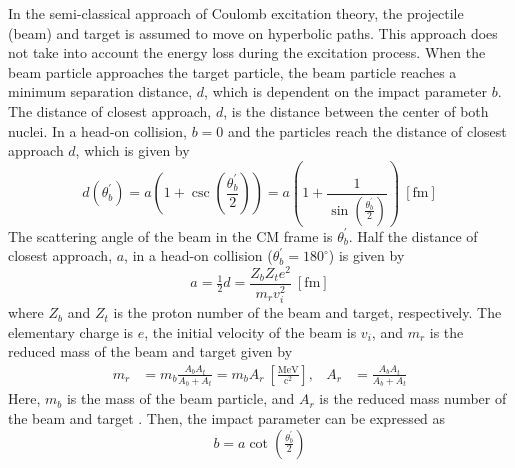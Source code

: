 \documentclass[twoside,english]{uiofysmaster/uiofysmaster}
\begin{document}
In the semi-classical approach of Coulomb excitation theory, the projectile (beam) and target is assumed to move on hyperbolic paths. 
This approach does not take into account the energy loss during the excitation process.
When the beam particle approaches the target particle, the beam particle reaches a minimum separation distance, $d$, which is dependent on the impact parameter $b$. 
The distance of closest approach, $d$, is the distance between the center of both nuclei. 
In a head-on collision, $b = 0$ and the particles reach the distance of closest approach $d$, which is given by
\begin{equation}
	d\left( \theta_b^{'} \right) = a \left( 1 + \csc \left( \frac{\theta_b^{'}}{2} \right) \right) = a \left( 1 + \frac{1}{\sin \left( \frac{\theta_b^{'}}{2} \right)} \right) ~[\text{fm}]
\end{equation}
The scattering angle of the beam in the CM frame is $\theta_b^{'}$.
Half the distance of closest approach, $a$, in a head-on collision ($\theta_b^{'} = 180^\circ$) is given by
\begin{equation}
	 a = \tfrac{1}{2} d = \frac{Z_b Z_t e^2}{m_r v_i^2} ~[\text{fm}]
\end{equation}
where $Z_b$ and $Z_t$ is the proton number of the beam and target, respectively. 
The elementary charge is $e$, the initial velocity of the beam is $v_i$, and $m_r$ is the reduced mass of the beam and target given by
\begin{align}
	 m_r &= m_b \frac{A_b A_t}{A_b + A_t} = m_b A_r  ~\left[ \tfrac{\text{MeV}}{\text{c}^2} \right],
	 &
	 A_r &= \frac{A_b A_t}{A_b + A_t}
\end{align}
Here, $m_b$ is the mass of the beam particle, and $A_r$ is the reduced mass number of the beam and target \cite{RBass, EE-Coulex}. 
Then, the impact parameter can be expressed as
\begin{equation}
	b = a \cot \left( \tfrac{\theta_b^{'}}{2} \right)
\end{equation}
\end{document}
